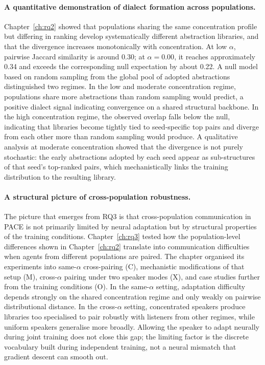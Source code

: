 \paragraph{A quantitative demonstration of dialect formation across populations.}
Chapter~\ref{ch:rq2} showed that populations sharing the same concentration profile but differing in ranking develop systematically different abstraction libraries, and that the divergence increases monotonically with concentration. At low $\alpha$, pairwise Jaccard similarity is around 0.30; at $\alpha = 0.00$, it reaches approximately 0.34 and exceeds the corresponding null expectation by about 0.22. A null model based on random sampling from the global pool of adopted abstractions distinguished two regimes. In the low and moderate concentration regime, populations share more abstractions than random sampling would predict, a positive dialect signal indicating convergence on a shared structural backbone. In the high concentration regime, the observed overlap falls below the null, indicating that libraries become tightly tied to seed-specific top pairs and diverge from each other more than random sampling would produce. A qualitative analysis at moderate concentration showed that the divergence is not purely stochastic: the early abstractions adopted by each seed appear as sub-structures of that seed's top-ranked pairs, which mechanistically links the training distribution to the resulting library.

\paragraph{A structural picture of cross-population robustness.}
The picture that emerges from RQ3 is that cross-population communication in PACE is not primarily limited by neural adaptation but by structural properties of the training conditions. Chapter~\ref{ch:rq3} tested how the population-level differences shown in Chapter~\ref{ch:rq2} translate into communication difficulties when agents from different populations are paired. The chapter organised its experiments into same-$\alpha$ cross-pairing (C), mechanistic modifications of that setup (M), cross-$\alpha$ pairing under two speaker modes (X), and case studies further from the training conditions (O). In the same-$\alpha$ setting, adaptation difficulty depends strongly on the shared concentration regime and only weakly on pairwise distributional distance. In the cross-$\alpha$ setting, concentrated speakers produce libraries too specialised to pair robustly with listeners from other regimes, while uniform speakers generalise more broadly. Allowing the speaker to adapt neurally during joint training does not close this gap; the limiting factor is the discrete vocabulary built during independent training, not a neural mismatch that gradient descent can smooth out.


